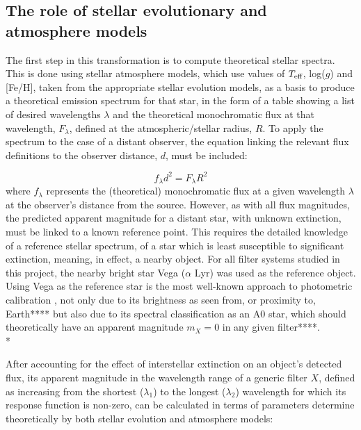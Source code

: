 \documentclass[12pt, a4paper]{report}
\begin{document}
\subsection{The role of stellar evolutionary and atmosphere models}
The first step in this transformation is to compute theoretical stellar spectra. This is done using stellar atmosphere models, which use values of $T_{\textnormal{eff}}$, log($g$) and [Fe/H], taken from the appropriate stellar evolution models, as a basis to produce a theoretical emission spectrum for that star, in the form of a table showing a list of desired wavelengths $\lambda$ and the theoretical monochromatic flux at that wavelength, $F_{\lambda}$, defined at the atmospheric/stellar radius, $R$. To apply the spectrum to the case of a distant observer, the equation linking the relevant flux definitions to the observer distance, $d$, must be included:

\begin{equation}
f_{\lambda}d^{2}=F_{\lambda}R^{2}
\label{flux_dist_rd}
\end{equation}
where $f_{\lambda}$ represents the (theoretical) monochromatic flux at a given wavelength $\lambda$ at the observer's distance from the source. However, as with all flux magnitudes, the predicted apparent magnitude for a distant star, with unknown extinction,  must be linked to a known reference point. This requires the detailed knowledge of a reference stellar spectrum, of a star which is least susceptible to significant extinction, meaning, in effect, a nearby object. For all filter systems studied in this project, the nearby bright star Vega ($\alpha$ Lyr) was used as the reference object. Using Vega as the reference star is the most well-known approach to photometric calibration \citep{2014MNRAS.444..392C}, not only due to its brightness as seen from, or proximity to, Earth**** but also due to its spectral classification as an A0 star, which should theoretically have an apparent magnitude $m_{X} = 0$ in any given filter****.\\*

After accounting for the effect of interstellar extinction on an object's detected flux, its apparent magnitude in the wavelength range of a generic filter $X$, defined as increasing from the shortest ($\lambda_{1}$) to the longest ($\lambda_{2}$) wavelength for which its response function is non-zero, can be calculated in terms of parameters determine theoretically by both stellar evolution and atmosphere models:
\end{document}
